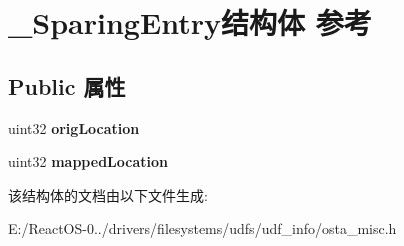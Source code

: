 \hypertarget{struct___sparing_entry}{}\section{\+\_\+\+Sparing\+Entry结构体 参考}
\label{struct___sparing_entry}
\subsection*{Public 属性}
\begin{DoxyCompactItemize}
\item 
\mbox{\label{struct___sparing_entry_aca5ecdd91ca526dc6024003473112309}} 
uint32 {\bfseries orig\+Location}
\item 
\mbox{\label{struct___sparing_entry_a09e21408f2f7abd9eabd4fd04309f11e}} 
uint32 {\bfseries mapped\+Location}
\end{DoxyCompactItemize}


该结构体的文档由以下文件生成\+:\begin{DoxyCompactItemize}
\item 
E\+:/\+React\+O\+S-\/0../drivers/filesystems/udfs/udf\+\_\+info/osta\+\_\+misc.\+h\end{DoxyCompactItemize}
